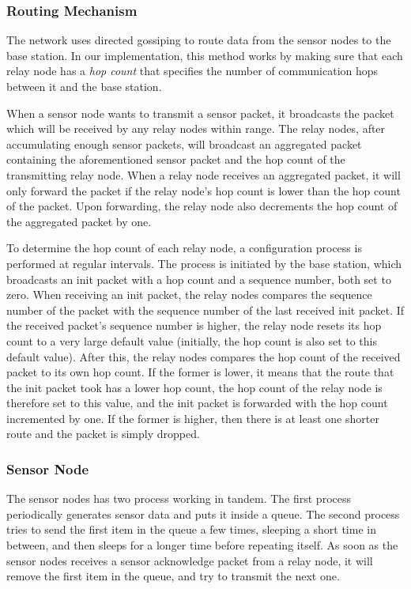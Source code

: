 \documentclass[conference]{IEEEtran}
\begin{document}
\subsubsection{Routing Mechanism} \label{sec:routing}

The network uses directed gossiping to route data from the sensor nodes to the
base station. In our implementation, this method works by making sure that each
relay node has a \emph{hop count} that specifies the number of communication
hops between it and the base station.

When a sensor node wants to transmit a sensor packet, it broadcasts the packet
which will be received by any relay nodes within range. The relay nodes, after
accumulating enough sensor packets, will broadcast an aggregated packet
containing the aforementioned sensor packet and the hop count of the
transmitting relay node. When a relay node receives an aggregated packet, it
will only forward the packet if the relay node's hop count is lower than the
hop count of the packet. Upon forwarding, the relay node also decrements the
hop count of the aggregated packet by one.

To determine the hop count of each relay node, a configuration process is
performed at regular intervals. The process is initiated by the base station,
which broadcasts an init packet with a hop count and a sequence number, both
set to zero. When receiving an init packet, the relay nodes compares the
sequence number of the packet with the sequence number of the last received
init packet. If the received packet's sequence number is higher, the relay node
resets its hop count to a very large default value (initially, the hop count is
also set to this default value). After this, the relay nodes compares the hop
count of the received packet to its own hop count. If the former is lower, it
means that the route that the init packet took has a lower hop count, the hop
count of the relay node is therefore set to this value, and the init packet is
forwarded with the hop count incremented by one. If the former is higher, then
there is at least one shorter route and the packet is simply dropped.

\subsubsection{Sensor Node}

The sensor nodes has two process working in tandem. The first process
periodically generates sensor data and puts it inside a queue. The second
process tries to send the first item in the queue a few times, sleeping a short
time in between, and then sleeps for a longer time before repeating itself. As
soon as the sensor nodes receives a sensor acknowledge packet from a relay
node, it will remove the first item in the queue, and try to transmit the next
one.
\end{document}

